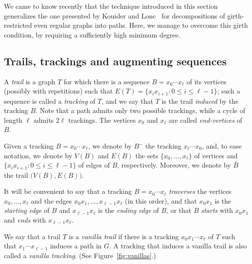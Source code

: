\documentclass[12pt,reqno,a4paper]{amsart}
\begin{document}
We came to know recently that the technique introduced in this section generalizes the one presented by Kouider and Lonc~\cite{KoLo99} for decompositions of girth-restricted even regular graphs into paths.
Here, we manage to overcome this girth condition, by requiring a sufficiently high minimum degree.

\subsection{Trails, trackings and augmenting sequences}

A \emph{trail} is a graph \(T\) for which there is a sequence
\(B=x_0\cdots x_\ell\) of its vertices (possibly with
  repetitions) such that \(E(T) = \{x_ix_{i+1}\colon 0\leq i\leq
\ell-1\}\); such a sequence is called a \emph{tracking} of \(T\), and
we say that \(T\) is the trail \emph{induced} by the tracking \(B\).
Note that a path admits only two possible trackings, while a cycle of
length \(\ell\) admits \(2\ell\) trackings.  The vertices \(x_0\) and
\(x_\ell\) are called \emph{end-vertices} of
\(B\).  

Given a tracking \(B=x_0\cdots x_\ell\), we denote by \(B^-\) the
tracking \(x_\ell \cdots x_0\), and, to ease notation, we denote
by \(V(B)\) and \(E(B)\) the sets \(\{x_0,\ldots,x_\ell\}\) of
vertices and \(\{x_ix_{i+1}\colon 0\leq i\leq \ell-1\}\) of edges of
\(B\), respectively. Moreover, we denote by \(\bar B\) the trail
\(\big(V(B),E(B)\big)\).

It will be convenient to say that a tracking \(B=x_0\cdots
  x_\ell\) \emph{traverses} the vertices $x_0,\ldots,x_\ell$ and the edges
  $x_0x_{1},\ldots,x_{\ell-1}x_{\ell}$ (in this order), and that
  $x_0x_1$ is the \emph{starting edge} of $B$
  and $x_{\ell-1}x_\ell$ is the \emph{ending edge} of $B$, or that $B$
  \emph{starts} with $x_0x_1$ and \emph{ends} with
  $x_{\ell-1}x_\ell$.
 
We say that a trail \(T\) is a \emph{vanilla trail}
if there is a tracking \(x_0x_1\cdots x_\ell\)
of \(T\) such that \(x_1\cdots x_{\ell-1}\) induces a path in
\(G\). A tracking that induces a vanilla trail is also called a
  \emph{vanilla tracking}.  (See Figure~\ref{fig:vanillas}.)



\end{document}
